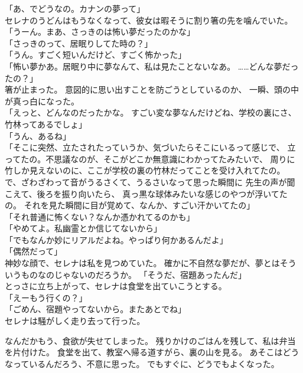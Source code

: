 \documentclass[../IHMain]{subfiles}
\begin{document}
「あ、でどうなの。カナンの夢って」\\
セレナのうどんはもうなくなって、彼女は暇そうに割り箸の先を噛んでいた。\\
「うーん。まあ、さっきのは怖い夢だったのかな」\\
「さっきのって、居眠りしてた時の？」\\
「うん。すごく短いんだけど、すごく怖かった」\\
「怖い夢かあ。居眠り中に夢なんて、私は見たことないなあ。
……どんな夢だったの？」\\
箸が止まった。
意図的に思い出すことを防ごうとしているのか、
一瞬、頭の中が真っ白になった。\\
「えっと、どんなのだったかな。
すごい変な夢なんだけどね、学校の裏にさ、竹林ってあるでしょ」\\
「うん、あるね」\\
「そこに突然、立たされたっていうか、気づいたらそこにいるって感じで、
立ってたの。不思議なのが、そこがどこか無意識にわかってたみたいで、
周りに竹しか見えないのに、ここが学校の裏の竹林だってことを受け入れてたの。
で、ざわざわって音がうるさくて、うるさいなって思った瞬間に
先生の声が聞こえて、後ろを振り向いたら、
真っ黒な球体みたいな感じのやつが浮いてたの。
それを見た瞬間に目が覚めて、なんか、すごい汗かいてたの」\\
「それ普通に怖くない？なんか憑かれてるのかも」\\
「やめてよ。私幽霊とか信じてないから」\\
「でもなんか妙にリアルだよね。やっぱり何かあるんだよ」\\
「偶然だって」\\
神妙な顔で、セレナは私を見つめていた。
確かに不自然な夢だが、夢とはそういうものなのじゃないのだろうか。
「そうだ、宿題あったんだ」\\
とっさに立ち上がって、セレナは食堂を出ていこうとする。\\
「えーもう行くの？」\\
「ごめん、宿題やってないから。またあとでね」\\
セレナは騒がしく走り去って行った。

なんだかもう、食欲が失せてしまった。
残りかけのごはんを残して、私は弁当を片付けた。
食堂を出て、教室へ帰る道すがら、裏の山を見る。
あそこはどうなっているんだろう、不意に思った。
でもすぐに、どうでもよくなった。
\end{document}
